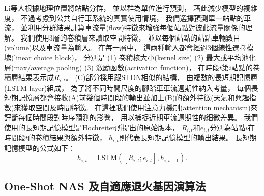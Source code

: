\documentclass[a4paper,14pt]{extarticle}
\begin{document}
            Li等人\cite{li2015traffic}根據地理位置將站點分群，
            並以群為單位進行預測，
            藉此減少模型的複雜度，
            不過考慮到公共自行車系統的真實使用情境，
            我們選擇預測單一站點的車流，
            並利用分群結果計算車流量(flow)特徵來增強每個站點對彼此流量關係的理解。
            我們使用3層的卷積層來讀取空間特徵，
            並以每個站點的站點車輛數目(volume)以及車流量為輸入。
            在每一層中，
            這兩種輸入都會經過3個線性選擇模塊(linear choice block)，
            分別是 (1) 卷積核大小(kernel size) (2) 最大或平均池化層(max/average pooling) (3) 激勵函數(activation function)，
            在時段$t$第$i$站點的卷積層結果表示成$R_{i,t}$。
            (C)部分採用跟STDN相似的結構，
            由複數的長短期記憶層(LSTM layer)組成，
            為了將不同時間尺度的腳踏車車流週期性納入考量，
            每個長短期記憶層都會接收(A)前幾個時間段的輸出並加上(B)的額外特徵(天氣和興趣指數)來獲取空間及時間特徵。
            在這裡我們使用注意力機制(attention mechanism)來評斷每個時間段對時序預測的影響，
            用以捕捉近期車流週期性的細微差異。
            我們使用的長短期記憶模型是Hochreiter\cite{10.1162/neco.1997.9.8.1735}所提出的原始版本，
            $R_{i,t}$和$e_{i,t}$分別為站點$i$在時間段$t$的卷積結果與額外特徵，
            $h_{i,t}$則代表長短期記憶模型的輸出結果。
            長短期記憶模型的公式如下：
            \begin{equation}
                h_{i,t} = \text{LSTM}([R_{i,t};e_{i,t}],h_{i,t-1}).
            \end{equation}

        \subsection{One-Shot NAS 及自適應退火基因演算法}
            
\end{document}
